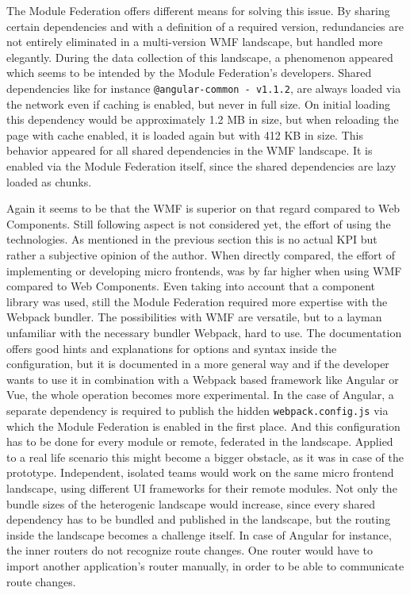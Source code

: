 The Module Federation offers different means for solving this issue. By sharing certain dependencies and with a definition of a required version, redundancies are not entirely eliminated in a multi-version WMF landscape, but handled more elegantly. During the data collection of this landscape, a phenomenon appeared which seems to be intended by the Module Federation's developers. Shared dependencies like for instance \texttt{@angular-common - v1.1.2}, are always loaded via the network even if caching is enabled, but never in full size. On initial loading this dependency would be approximately 1.2 MB in size, but when reloading the page with cache enabled, it is loaded again but with 412 KB in size.
This behavior appeared for all shared dependencies in the WMF landscape. It is enabled via the Module Federation itself, since the shared dependencies are lazy loaded as chunks.\cite{wmf_the_good_and_ugly}

Again it seems to be that the WMF is superior on that regard compared to Web Components. Still following aspect is not considered yet, the effort of using the technologies. As mentioned in the previous section this is no actual KPI but rather a subjective opinion of the author. When directly compared, the effort of implementing or developing micro frontends, was by far higher when using WMF compared to Web Components. Even taking into account that a component library was used, still the Module Federation required more expertise with the Webpack bundler.
The possibilities with WMF are versatile, but to a layman unfamiliar with the necessary bundler Webpack, hard to use. The documentation offers good hints and explanations for options and syntax inside the configuration, but it is documented in a more general way and if the developer wants to use it in combination with a Webpack based framework like Angular or Vue, the whole operation becomes more experimental. In the case of Angular, a separate dependency is required to publish the hidden \texttt{webpack.config.js} via which the Module Federation is enabled in the first place. And this configuration has to be done for every module or remote, federated in the landscape. Applied to a real life scenario this might become a bigger obstacle, as it was in case of the prototype. Independent, isolated teams would work on the same micro frontend landscape, using different UI frameworks for their remote modules. Not only the bundle sizes of the heterogenic landscape would increase, since every shared dependency has to be bundled and published in the landscape, but the routing inside the landscape becomes a challenge itself. In case of Angular for instance, the inner routers do not recognize route changes. One router would have to import another application's router manually, in order to be able to communicate route changes.\cite{wmf_the_good_and_ugly}

